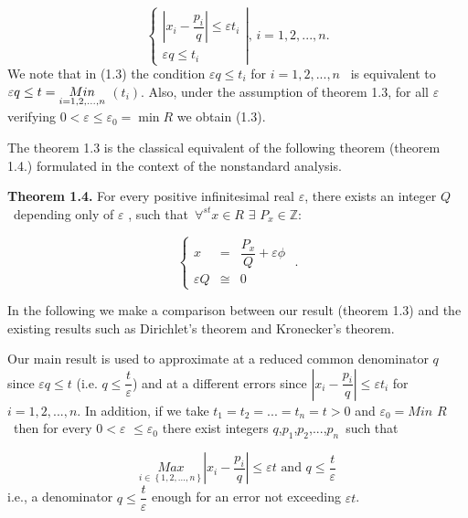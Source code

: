\documentclass[12pt]{article}
\begin{document}
\begin{equation}
\left\{ 
\begin{array}{c}
\left\vert x_{i}-\dfrac{p_{i}}{q}\right\vert \leq \varepsilon t_{i} \\ 
\varepsilon q\leq t_{i}%
\end{array}%
\right\vert \text{, }i=1,2,...,n\text{.}  \tag{1.3}
\end{equation}%
We note that in (1.3) the condition $\varepsilon q\leq t_{i}$ for $%
i=1,2,...,n$ \ is equivalent to $\varepsilon q\leq t=\underset{i=1,2,...,n}{%
Min}$ $\left( t_{i}\right) $. Also, under the assumption of theorem 1.3, for
all $\varepsilon $ verifying $0<\varepsilon \leq \varepsilon _{0}=\min R$ we
obtain (1.3).

The theorem 1.3 is the classical equivalent of the following theorem
(theorem 1.4.) formulated in the context of the nonstandard analysis.

\noindent \textbf{Theorem 1.4. }For every positive infinitesimal real $%
\varepsilon $, there exists an integer $Q$\ depending only of $\varepsilon $%
, such that\ $\forall ^{st}x\in R$ $\exists $ $P_{x}\in \mathbb{Z}$:

\begin{equation}
\left\{ 
\begin{array}{ccc}
x & = & \dfrac{P_{x}}{Q}+\varepsilon \phi \\ 
\varepsilon Q & \cong & 0%
\end{array}%
\text{ .}\right.  \tag{1.4}
\end{equation}

In the following we make a comparison between our result (theorem 1.3) and
the existing results such as Dirichlet's theorem and Kronecker's theorem.

Our main result is used to approximate at a reduced common denominator $q$
since $\varepsilon q\leq t$ (i.e. $q\leq \dfrac{t}{\varepsilon }$) and at a
different errors since $\left\vert x_{i}-\dfrac{p_{i}}{q}\right\vert \leq
\varepsilon t_{i}$ for $i=1,2,...,n$. In addition, if we take $%
t_{1}=t_{2}=...=t_{n}=t>0$ and $\varepsilon _{0}=Min$ $R$ \ then for every $%
0<\varepsilon $ $\leq \varepsilon _{0}$ there exist integers $q$,$p_{1}$,$%
p_{2}$,$...$,$p_{n}$\ such that

\begin{equation}
\underset{i\in \left\{ 1,2,...,n\right\} }{Max}\left\vert x_{i}-\dfrac{p_{i}%
}{q}\right\vert \leq \varepsilon t\text{ and }q\leq \dfrac{t}{\varepsilon } 
\tag{1.5}
\end{equation}%
i.e., a denominator $q\leq \dfrac{t}{\varepsilon }$ enough for an error not
exceeding $\varepsilon t$.
\end{document}

